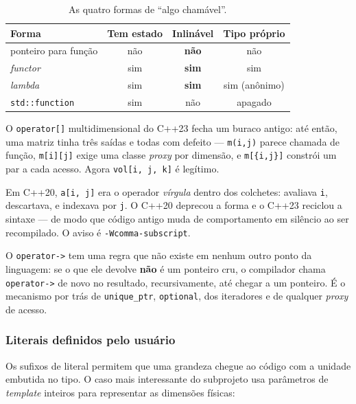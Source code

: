 \begin{table}[htbp]
\centering
\caption{As quatro formas de ``algo chamável''.}
\label{tab:chamaveis}
\footnotesize
\begin{tabular}{@{}lccc@{}}
\toprule
\textbf{Forma} & \textbf{Tem estado} & \textbf{Inlinável} & \textbf{Tipo próprio} \\
\midrule
ponteiro para função & não & \textbf{não} & não \\
\emph{functor}       & sim & \textbf{sim} & sim \\
\emph{lambda}        & sim & \textbf{sim} & sim (anônimo) \\
\texttt{std::function} & sim & não & apagado \\
\bottomrule
\end{tabular}
\end{table}

O \texttt{operator[]} multidimensional do C++23 fecha um buraco antigo: até
então, uma matriz tinha três saídas e todas com defeito --- \texttt{m(i,j)}
parece chamada de função, \texttt{m[i][j]} exige uma classe \emph{proxy} por
dimensão, e \texttt{m[\{i,j\}]} constrói um par a cada acesso. Agora
\texttt{vol[i, j, k]} é legítimo.

\begin{armadilha}
Em C++20, \texttt{a[i, j]} era o operador \emph{vírgula} dentro dos colchetes:
avaliava \texttt{i}, descartava, e indexava por \texttt{j}. O C++20 deprecou a
forma e o C++23 reciclou a sintaxe --- de modo que código antigo muda de
comportamento em silêncio ao ser recompilado. O aviso é
\texttt{-Wcomma-subscript}.
\end{armadilha}

O \texttt{operator->} tem uma regra que não existe em nenhum outro ponto da
linguagem: se o que ele devolve \textbf{não} é um ponteiro cru, o compilador
chama \texttt{operator->} de novo no resultado, recursivamente, até chegar a um
ponteiro. É o mecanismo por trás de \texttt{unique\_ptr},
\texttt{optional}, dos iteradores e de qualquer \emph{proxy} de acesso.

\subsubsection{Literais definidos pelo usuário}

Os sufixos de literal permitem que uma grandeza chegue ao código com a unidade
embutida no tipo. O caso mais interessante do subprojeto usa parâmetros de
\emph{template} inteiros para representar as dimensões físicas:

